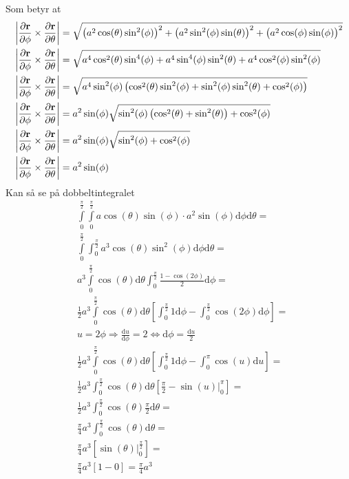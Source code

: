 \documentclass[a4paper,10pt,english]{article}
\newcommand{\dd}[1]{\mathrm{d}#1}
\begin{document}
	Som betyr at
	\begin{align*}
		&\abs{\frac{\partial \mathbf{r}}{\partial \phi} \times \frac{\partial \mathbf{r}}{\partial \theta} }=\sqrt{\left(a^2 \cos(\theta) \sin^2(\phi)\right)^2 + \left (a^2 \sin^2(\phi)\sin(\theta) \right)^2 + \left (a^2 \cos(\phi) \sin(\phi)\right )^2}\\
		&\abs{\frac{\partial \mathbf{r}}{\partial \phi} \times \frac{\partial \mathbf{r}}{\partial \theta} }=\sqrt{a^4 \cos^2(\theta)\sin^4(\phi) + a^4 \sin^4(\phi)\sin^2(\theta) + a^4 \cos^2(\phi) \sin^2(\phi)}\\
		&\abs{\frac{\partial \mathbf{r}}{\partial \phi} \times \frac{\partial \mathbf{r}}{\partial \theta} }=\sqrt{a^4 \sin^2(\phi) \left (\cos^2(\theta)\sin^2(\phi) +\sin^2(\phi)\sin^2(\theta)+ \cos^2(\phi)\right )}\\
		&\abs{\frac{\partial \mathbf{r}}{\partial \phi} \times \frac{\partial \mathbf{r}}{\partial \theta} }=a^2 \sin(\phi) \sqrt{\sin^2(\phi) \left (\cos^2(\theta) + \sin^2(\theta) \right ) + \cos^2(\phi)}\\
		&\abs{\frac{\partial \mathbf{r}}{\partial \phi} \times \frac{\partial \mathbf{r}}{\partial \theta} }=a^2 \sin(\phi) \sqrt{\sin^2(\phi) + \cos^2(\phi)}\\
		&\abs{\frac{\partial \mathbf{r}}{\partial \phi} \times \frac{\partial \mathbf{r}}{\partial \theta} }=a^2 \sin(\phi)
	\end{align*}
	Kan så se på dobbeltintegralet
	\begin{align*}
		&\int\limits_0^{\frac{\pi}{2}} \int\limits_0^{\frac{\pi}{2}}a \cos(\theta) \sin(\phi) \cdot a^2 \sin(\phi) \dd{\phi}\dd{\theta} =\\
		&\int\limits_0^{\frac{\pi}{2}} \int_0^{\frac{\pi}{2}} a^3 \cos(\theta) \sin^2(\phi) \dd{\phi}\dd{\theta}=\\
		&a^3\int\limits_0^{\frac{\pi}{2}} \cos(\theta) \dd{\theta} \int_0^{\frac{\pi}{2}}\frac{1-\cos(2 \phi)}{2}\dd{\phi}=\\
		&\frac{1}{2}a^3\int\limits_0^{\frac{\pi}{2}}\cos(\theta) \dd{\theta} \left [ \int_0^{\frac{\pi}{2}}1 \dd{\phi}-\int_0^{\frac{\pi}{2}}\cos(2 \phi)\dd{\phi} \right ]=\\
		&\boxed{u=2 \phi \Rightarrow \frac{\dd{u}}{\dd{\phi}}=2 \Leftrightarrow \dd{\phi}= \frac{\dd{u}}{2}}\\
		&\frac{1}{2}a^3\int\limits_0^{\frac{\pi}{2}}\cos(\theta) \dd{\theta} \left [ \int_0^{\frac{\pi}{2}}1 \dd{\phi}- \int_0^\pi \cos(u) \dd{u} \right ]=\\
		&\frac{1}{2}a^3\int_0^{\frac{\pi}{2}}\cos(\theta) \dd{\theta} \left [\frac{\pi}{2} - \left. \sin(u) \right |_0^\pi \right ] =\\
		&\frac{1}{2}a^3\int_0^{\frac{\pi}{2}}\cos(\theta)\frac{\pi}{2}\dd{\theta}=\\
		&\frac{\pi}{4}a^3\int_0^{\frac{\pi}{2}}\cos(\theta)\dd{\theta}=\\
		&\frac{\pi}{4}a^3 \left [ \left. \sin(\theta) \right |_0^{\frac{\pi}{2}} \right ]=\\ 
		&\frac{\pi}{4}a^3 \left [1 -0 \right ]= \frac{\pi}{4}a^3
	\end{align*}
	\newpage
\end{document}
